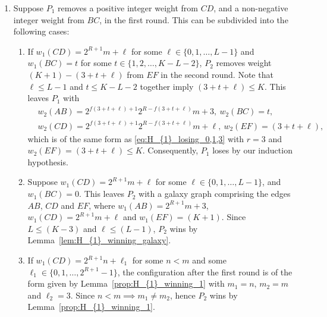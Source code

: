 \documentclass[11pt,reqno]{amsart}
\theoremstyle{definition}
\theoremstyle{definition}
\begin{document}
\begin{enumerate}
\item Suppose $P_{1}$ removes a positive integer weight from $CD$, and a non-negative integer weight from $BC$, in the first round. This can be subdivided into the following cases:
\begin{enumerate}
\item If $w_{1}(CD)=2^{R+1}m+\ell$ for some $\ell \in \{0,1,\ldots,L-1\}$ and $w_{1}(BC)=t$ for some $t \in \{1,2,\ldots,K-L-2\}$, $P_{2}$ removes weight $(K+1)-(3+t+\ell)$ from $EF$ in the second round. Note that $\ell \leqslant L-1$ and $t \leqslant K-L-2$ together imply $(3+t+\ell)\leqslant K$. This leaves $P_{1}$ with
\begin{align}
{}&w_{2}(AB)=2^{f(3+t+\ell)+1}2^{R-f(3+t+\ell)}m+3,\ w_{2}(BC)=t,\nonumber\\
{}&w_{2}(CD)=2^{f(3+t+\ell)+1}2^{R-f(3+t+\ell)}m+\ell,\ w_{2}(EF)=(3+t+\ell),\nonumber
\end{align}
which is of the same form as \eqref{eq:H_{1}_losing_0,1,3} with $r=3$ and $w_{2}(EF)=(3+t+\ell)\leqslant K$. Consequently, $P_{1}$ loses by our induction hypothesis.

\item Suppose $w_{1}(CD)=2^{R+1}m+\ell$ for some $\ell \in \{0,1,\ldots,L-1\}$, and $w_{1}(BC)=0$. This leaves $P_{2}$ with a galaxy graph comprising the edges $AB$, $CD$ and $EF$, where $w_{1}(AB)=2^{R+1}m+3$, $w_{1}(CD)=2^{R+1}m+\ell$ and $w_{1}(EF)=(K+1)$. Since $L \leqslant (K-3)$ and $\ell\leqslant (L-1)$, $P_{2}$ wins by Lemma~\ref{lem:H_{1}_winning_galaxy}.

\item If $w_{1}(CD)=2^{R+1}n+\ell_{1}$ for some $n < m$ and some $\ell_{1}\in\{0,1,\ldots,2^{R+1}-1\}$, the configuration after the first round is of the form given by Lemma~\ref{prop:H_{1}_winning_1} with $m_{1}=n$, $m_{2}=m$ and $\ell_{2}=3$. Since $n<m \implies m_{1}\neq m_{2}$, hence $P_{2}$ wins by Lemma~\ref{prop:H_{1}_winning_1}.
\end{enumerate}


\end{enumerate}
\end{document}
